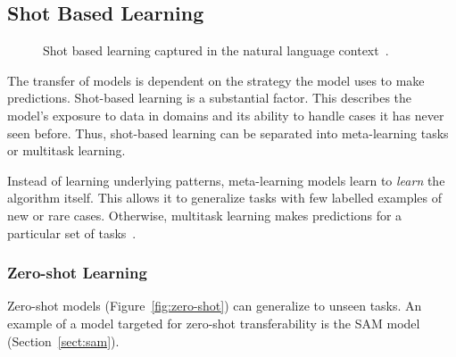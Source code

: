 \documentclass[11pt,twoside]{report}
\begin{document}
\subsection{Shot Based Learning}

\begin{figure}[H]
  \centering
  \caption{Shot based learning captured in the natural language context~\cite{openaishotbasedlearning}.}
\end{figure}

The transfer of models is dependent on the strategy the model uses to make predictions. Shot-based learning is a substantial factor. This describes the model's exposure to data in domains and its ability to handle cases it has never seen before. Thus, shot-based learning can be separated into meta-learning tasks or multitask learning. 

Instead of learning underlying patterns, meta-learning models learn to \textit{learn} the algorithm itself. This allows it to generalize tasks with few labelled examples of new or rare cases. Otherwise, multitask learning makes predictions for a particular set of tasks~\cite{deep-learning-book}.

\subsubsection{Zero-shot Learning}\label{sect:zero-shot-learning}

Zero-shot models (Figure~\ref{fig:zero-shot}) can generalize to unseen tasks. An example of a model targeted for zero-shot transferability is the SAM model (Section~\ref{sect:sam}).
\end{document}
